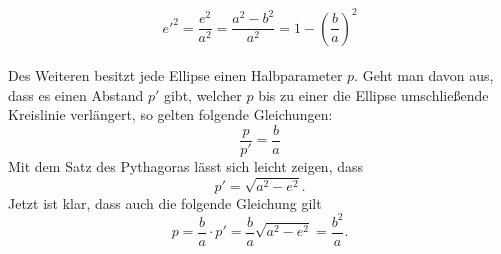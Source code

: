 \begin{equation}
	e'^2=\frac{e^2}{a^2}=\frac{a^2-b^2}{a^2}=1-\left(\frac{b}{a}\right)^2 
	\label{equation_kepler_b}
\end{equation} 
\\Des Weiteren besitzt jede Ellipse einen Halbparameter \ensuremath{p}. Geht man davon aus, dass es einen Abstand \ensuremath{p'} gibt, welcher \ensuremath{p} bis zu einer die Ellipse umschließende Kreislinie verlängert, so gelten folgende Gleichungen:
\begin{equation}
	\frac{p}{p'}=\frac{b}{a}
	\label{equation_kepler_p}
\end{equation}
Mit dem Satz des Pythagoras lässt sich leicht zeigen, dass
\begin{equation}
p' = \sqrt{a^2-e^2}.
\end{equation}
Jetzt ist klar, dass auch die folgende Gleichung gilt
\begin{equation}
p=\frac{b}{a} \cdot p'= \frac{b}{a} \sqrt{a^2-e^2} = \frac{b^2}{a}.
\label{equation_kepler_simple_p}
\end{equation}

